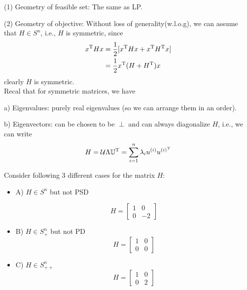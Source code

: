 (1) Geometry of feasible set: The same as LP.

(2) Geometry of objective: Without loss of generality(w.l.o.g), we can assume that $H\in S^n$, i.e., $H$ is symmetric, since
\begin{align*}
x^{{\rm T}}Hx 
&=\frac{1}{2}[x^{{\rm T}}Hx + x^{{\rm T}}H^{{\rm T}}x]\\
&= \frac{1}{2}x^{{\rm T}}(H+H^{{\rm T}})x
\end{align*}
clearly $H$ is symmetric.\\

Recal that for symmetric matrices, we have

a) Eigenvalues: purely real eigenvalues (so we can arrange them in an order).

b) Eigenvectors: can be chosen to be $\perp$ and can always diagonalize $H$, i.e., we can write
$$H = \mathcal{U}\Lambda \mathbb{U}^{{\rm T}}  = \sum^n_{i=1}\lambda_iu^{(i)}u^{(i)^{{\rm T}}}$$

Consider following 3 different cases for the matrix $H$:
\begin{itemize}
	\item A) $H\in S^n$ but not PSD
	
	\begin{equation*}
	H = 
	\begin{bmatrix}
	1&0\\
	0&-2
	\end{bmatrix}
	\end{equation*}
	
	\item B) $H\in S^n_+$ but not PD
	\begin{equation*}
	H = 
	\begin{bmatrix}
	1&0\\
	0&0
	\end{bmatrix}
	\end{equation*}
	
	\item C) $H\in S^n_{++}$
	\begin{equation*}
	H = \begin{bmatrix}
	1&0\\
	0&2
	\end{bmatrix}
	\end{equation*}
\end{itemize}




